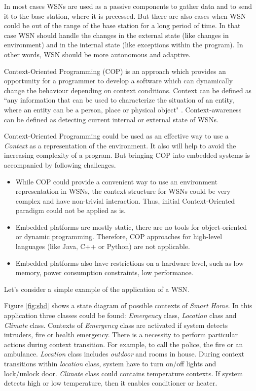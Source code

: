 \documentclass{ubicomp-ext}
\begin{document}
In most cases WSNs are used as a passive components to gather data and to send it to the base station, where it is precessed. But there are also cases when WSN could be out of the range of the base station for a long period of time. In that case WSN should handle the changes in the external state (like changes in environment) and in the internal state (like exceptions within the program). In other words, WSN should be more autonomous and adaptive.

Context-Oriented Programming (COP) \cite{hirschfeld08} is an approach which provides an opportunity for a programmer to develop a software which can dynamically change the behaviour depending on context conditions. Context can be defined as ``any information that can be used to characterize the situation of an entity, where an entity can be a person, place or physical object" \cite{dey99}. Context-awareness can be defined as detecting current internal or external state of WSNs.

Context-Oriented Programming could be used as an effective way to use a \textit{Context} as a representation of the environment. It also will help to avoid the increasing complexity of a program. But bringing COP into embedded systems is accompanied by following challenges.

\begin{itemize}\compresslist
\item
While COP could provide a convenient way to use an environment representation in WSNs, the context structure for WSNs could be very complex and have non-trivial interaction. Thus, initial Context-Oriented paradigm could not be applied as is.
\item
Embedded platforms are mostly static, there are no tools for object-oriented or dynamic programming. Therefore, COP approaches for high-level languages (like Java, C++ or Python) are not applicable. 
\item
Embedded platforms also have restrictions on a hardware level, such as low memory, power consumption constraints, low performance.
\end{itemize}

Let's consider a simple example of the application of a WSN. 

Figure \ref{fig:shd} shows a state diagram of possible contexts of \textit{Smart Home}. In this application three classes could be found: \textit{Emergency} class, \textit{Location} class and \textit{Climate} class. Contexts of \textit{Emergency} class are activated if system detects intruders, fire or health emergency. There is a necessity to perform particular actions during context transition. For example, to call the police, the fire or an ambulance. \textit{Location} class includes \textit{outdoor} and rooms in house. During context transitions within \textit{location} class, system have to turn on/off lights and lock/unlock door. \textit{Climate} class could contains temperature contexts. If system detects high or low temperature, then it enables conditioner or heater.
\end{document}
